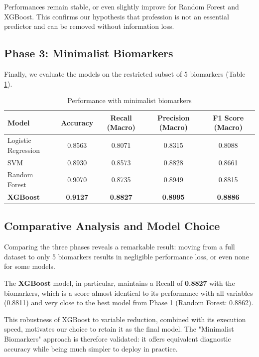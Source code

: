 \documentclass[12pt,a4paper]{article}
\begin{document}
    Performances remain stable, or even slightly improve for Random Forest and XGBoost. This confirms our hypothesis that profession is not an essential predictor and can be removed without information loss.

    \subsection{Phase 3: Minimalist Biomarkers}
    Finally, we evaluate the models on the restricted subset of 5 biomarkers (Table \ref{tab:results_bio}).

    \begin{table}[H]
        \centering
        \begin{tabular}{|l|c|c|c|c|}
            \hline
            \textbf{Model} & \textbf{Accuracy} & \textbf{Recall (Macro)} & \textbf{Precision (Macro)} & \textbf{F1 Score (Macro)} \\
            \hline
            Logistic Regression & 0.8563 & 0.8071 & 0.8315 & 0.8088 \\
            SVM & 0.8930 & 0.8573 & 0.8828 & 0.8661 \\
            Random Forest & 0.9070 & 0.8735 & 0.8949 & 0.8815 \\
            \textbf{XGBoost} & \textbf{0.9127} & \textbf{0.8827} & \textbf{0.8995} & \textbf{0.8886} \\
            \hline
        \end{tabular}
        \caption{Performance with minimalist biomarkers}
        \label{tab:results_bio}
    \end{table}

    \subsection{Comparative Analysis and Model Choice}
    Comparing the three phases reveals a remarkable result: moving from a full dataset to only 5 biomarkers results in negligible performance loss, or even none for some models.

    The \textbf{XGBoost} model, in particular, maintains a Recall of \textbf{0.8827} with the biomarkers, which is a score almost identical to its performance with all variables (0.8811) and very close to the best model from Phase 1 (Random Forest: 0.8862).

    This robustness of XGBoost to variable reduction, combined with its execution speed, motivates our choice to retain it as the final model. The "Minimalist Biomarkers" approach is therefore validated: it offers equivalent diagnostic accuracy while being much simpler to deploy in practice.
\end{document}
